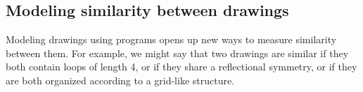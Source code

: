 \documentclass{article}
\newcommand{\probability}{\mathds{P}} %
\begin{document}



\subsection{Modeling similarity between drawings}
Modeling drawings using programs opens up new ways to measure similarity between them.
For example, we might say that two drawings are similar if they both contain loops of length 4,
or if they share a reflectional symmetry,
or if they are both organized according to a grid-like structure.
\end{document}

